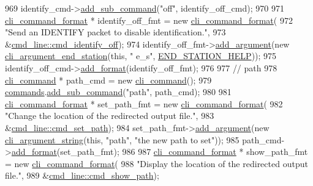 \begin{DoxyCode}
969     identify\_cmd->\hyperlink{classcli__command_aa73a67e8ebb6facd4b40ced66279b226}{add\_sub\_command}(\textcolor{stringliteral}{"off"}, identify\_off\_cmd);
970 
971     \hyperlink{classcli__command__format}{cli\_command\_format} * identify\_off\_fmt = \textcolor{keyword}{new} 
      \hyperlink{classcli__command__format}{cli\_command\_format}(
972         \textcolor{stringliteral}{"Send an IDENTIFY packet to disable identification."},
973         &\hyperlink{classcmd__line_af43957351c668064746ad16774446b33}{cmd\_line::cmd\_identify\_off});
974     identify\_off\_fmt->\hyperlink{classcli__command__format_ac3fc6d13a227c195d5ee6f7b78eba9cd}{add\_argument}(\textcolor{keyword}{new} \hyperlink{classcli__argument__end__station}{cli\_argument\_end\_station}(\textcolor{keyword}{this}, \textcolor{stringliteral}{"
      e\_s"}, \hyperlink{cmd__line_8cpp_a5ca225cf97165ab1d1472609c4e765f6}{END\_STATION\_HELP}));
975     identify\_off\_cmd->\hyperlink{classcli__command_aa9ec38e761644d946f8db2b920e39921}{add\_format}(identify\_off\_fmt);
976 
977     \textcolor{comment}{// path}
978     \hyperlink{classcli__command}{cli\_command} * path\_cmd = \textcolor{keyword}{new} \hyperlink{classcli__command}{cli\_command}();
979     \hyperlink{classcmd__line_ae4fea670c2fdd2b60f7b5b6ad6fbaf1e}{commands}.\hyperlink{classcli__command_aa73a67e8ebb6facd4b40ced66279b226}{add\_sub\_command}(\textcolor{stringliteral}{"path"}, path\_cmd);
980 
981     \hyperlink{classcli__command__format}{cli\_command\_format} * set\_path\_fmt = \textcolor{keyword}{new} \hyperlink{classcli__command__format}{cli\_command\_format}(
982         \textcolor{stringliteral}{"Change the location of the redirected output file."},
983         &\hyperlink{classcmd__line_a89e496f9320fa05b963d18b9b0d34864}{cmd\_line::cmd\_set\_path});
984     set\_path\_fmt->\hyperlink{classcli__command__format_ac3fc6d13a227c195d5ee6f7b78eba9cd}{add\_argument}(\textcolor{keyword}{new} \hyperlink{classcli__argument__string}{cli\_argument\_string}(\textcolor{keyword}{this}, \textcolor{stringliteral}{"path"}, \textcolor{stringliteral}{"the
       new path to set"}));
985     path\_cmd->\hyperlink{classcli__command_aa9ec38e761644d946f8db2b920e39921}{add\_format}(set\_path\_fmt);
986 
987     \hyperlink{classcli__command__format}{cli\_command\_format} * show\_path\_fmt = \textcolor{keyword}{new} 
      \hyperlink{classcli__command__format}{cli\_command\_format}(
988         \textcolor{stringliteral}{"Display the location of the redirected output file."},
989         &\hyperlink{classcmd__line_aac82b5a0cfcfb2b960130c9f5866c6b8}{cmd\_line::cmd\_show\_path});

\end{DoxyCode}
